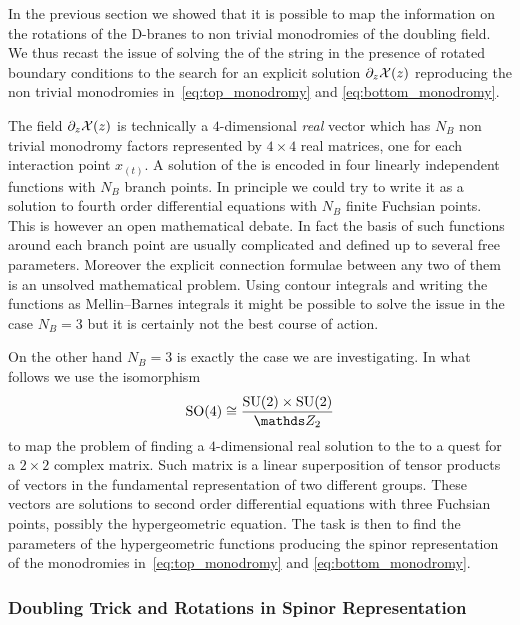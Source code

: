 In the previous section we showed that it is possible to map the information on the rotations of the D-branes to non trivial monodromies of the doubling field.
We thus recast the issue of solving the \eom of the string in the presence of rotated boundary conditions to the search for an explicit solution $\partial_{z} \mathcal{X}( z )$ reproducing the non trivial monodromies in~\eqref{eq:top_monodromy} and \eqref{eq:bottom_monodromy}.

The field $\partial_{z} \mathcal{X}( z )$ is technically a $4$-dimensional \emph{real} vector which has $N_B$ non trivial monodromy factors represented by $4
\times 4$ real matrices, one for each interaction point $x_{(t)}$.
A solution of the \eom is encoded in four linearly independent functions with $N_B$ branch points.
In principle we could try to write it as a solution to fourth order differential equations with $N_B$ finite Fuchsian points.
This is however an open mathematical debate.
In fact the basis of such functions around each branch point are usually complicated and defined up to several free parameters.
Moreover the explicit connection formulae between any two of them is an unsolved mathematical problem.
Using contour integrals and writing the functions as Mellin--Barnes integrals it might be possible to solve the issue in the case $N_B = 3$ but it is certainly not the best course of action.

On the other hand $N_B = 3$ is exactly the case we are investigating.
In what follows we use the isomorphism
\begin{equation}
  \SO{4}
  \cong
  \frac{\SU{2} \times \SU{2}}{\Z_2}
  \label{eq:su2isomorphism}
\end{equation}
to map the problem of finding a $4$-dimensional real solution to the \eom to a quest for a $2 \times 2$ complex matrix.
Such matrix is a linear superposition of tensor products of vectors in the fundamental representation of two different  groups.
These vectors are solutions to second order differential equations with three Fuchsian points, possibly the hypergeometric equation.
The task is then to find the parameters of the hypergeometric functions producing the spinor representation of the monodromies in~\eqref{eq:top_monodromy} and \eqref{eq:bottom_monodromy}.


\subsubsection{Doubling Trick and Rotations in Spinor Representation}

